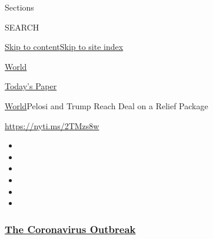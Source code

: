 Sections

SEARCH

\protect\hyperlink{site-content}{Skip to
content}\protect\hyperlink{site-index}{Skip to site index}

\href{https://www.nytimes3xbfgragh.onion/section/world}{World}

\href{https://myaccount.nytimes3xbfgragh.onion/auth/login?response_type=cookie\&client_id=vi}{}

\href{https://www.nytimes3xbfgragh.onion/section/todayspaper}{Today's
Paper}

\href{/section/world}{World}\textbar{}Pelosi and Trump Reach Deal on a
Relief Package

\url{https://nyti.ms/2TMzs8w}

\begin{itemize}
\item
\item
\item
\item
\item
\item
\end{itemize}

\hypertarget{the-coronavirus-outbreak}{%
\subsubsection{\texorpdfstring{\href{https://www.nytimes3xbfgragh.onion/news-event/coronavirus?name=styln-coronavirus-national\&region=TOP_BANNER\&variant=undefined\&block=storyline_menu_recirc\&action=click\&pgtype=Article\&impression_id=9fcf9940-e39b-11ea-ad54-c52f02c320cd}{The
Coronavirus
Outbreak}}{The Coronavirus Outbreak}}\label{the-coronavirus-outbreak}}

